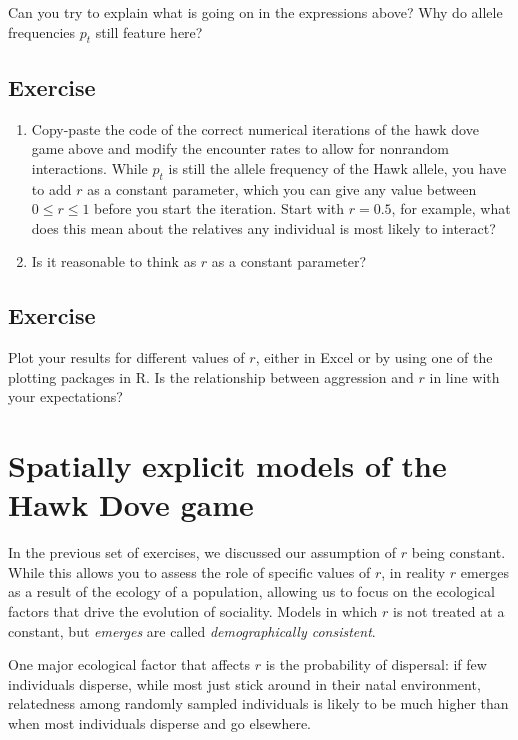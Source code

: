 \documentclass[
]{book}
\begin{document}
Can you try to explain what is going on in the expressions above? Why do allele frequencies \(p_{t}\) still feature here?

\hypertarget{exercise-9}{%
\section{Exercise}\label{exercise-9}}

\begin{enumerate}
\def\labelenumi{\arabic{enumi}.}
\item
  Copy-paste the code of the correct numerical iterations of the hawk dove game above and modify the encounter rates to allow for nonrandom interactions. While \(p_{t}\) is still the allele frequency of the Hawk allele, you have to add \(r\) as a constant parameter, which you can give any value between \(0 \leq r \leq 1\) before you start the iteration. Start with \(r=0.5\), for example, what does this mean about the relatives any individual is most likely to interact?
\item
  Is it reasonable to think as \(r\) as a constant parameter?
\end{enumerate}

\hypertarget{exercise-10}{%
\section{Exercise}\label{exercise-10}}

Plot your results for different values of \(r\), either in Excel or by using one of the plotting packages in R. Is the relationship between aggression and \(r\) in line with your expectations?

\hypertarget{spatially-explicit-models-of-the-hawk-dove-game}{%
\chapter{Spatially explicit models of the Hawk Dove game}\label{spatially-explicit-models-of-the-hawk-dove-game}}

In the previous set of exercises, we discussed our assumption of \(r\) being constant. While this allows you to assess the role of specific values of \(r\), in reality \(r\) emerges as a result of the ecology of a population, allowing us to focus on the ecological factors that drive the evolution of sociality. Models in which \(r\) is not treated at a constant, but \emph{emerges} are called \emph{demographically consistent}.

One major ecological factor that affects \(r\) is the probability of dispersal: if few individuals disperse, while most just stick around in their natal environment, relatedness among randomly sampled individuals is likely to be much higher than when most individuals disperse and go elsewhere.
\end{document}
